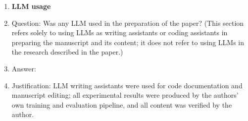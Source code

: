 \begin{enumerate}
\item {\bf LLM usage}
    \item[] Question: Was any LLM used in the preparation of the paper? (This section refers solely to using LLMs as writing assistants or coding assistants in preparing the manuscript and its content; it does not refer to using LLMs in the research described in the paper.)
    \item[] Answer: \answerYes{}
    \item[] Justification: LLM writing assistants were used for code documentation and manuscript editing; all experimental results were produced by the authors' own training and evaluation pipeline, and all content was verified by the author.

\end{enumerate}